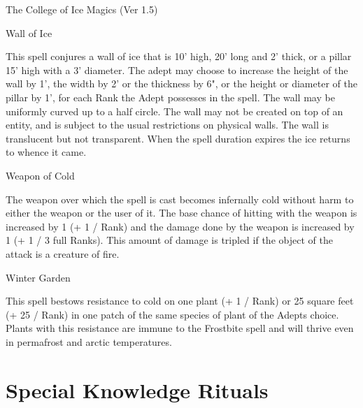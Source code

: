 \begin{Chapter}{The College of Ice Magics (Ver 1.5)}
\begin{spell}[S-15]{Wall of Ice}
\begin{effects}
This spell conjures a wall of ice that is 10’ high, 20’ long and 2’
thick, or a pillar 15’ high with a 3’ diameter.  The adept may choose
to increase the height of the wall by 1’, the width by 2’ or the
thickness by 6", or the height or diameter of the pillar by 1’, for
each Rank the Adept possesses in the spell. The wall may be uniformly
curved up to a half circle. The wall may not be created on top of an
entity, and is subject to the usual restrictions on physical walls.
The wall is translucent but not transparent. When the spell duration
expires the ice returns to whence it came.
\end{effects}
\end{spell}

\begin{spell}[S-16]{Weapon of Cold}
\begin{effects}
The weapon over which the spell is cast becomes infernally cold
without harm to either the weapon or the user of it. The base chance
of hitting with the weapon is increased by 1 (+ 1 / Rank) and the
damage done by the weapon is increased by 1 (+ 1 / 3 full Ranks).
This amount of damage is tripled if the object of the attack is a
creature of fire.
\end{effects}
\end{spell}

\begin{spell}[S-17]{Winter Garden}

\begin{effects}
This spell bestows resistance to cold on one plant (+ 1 / Rank) or 25
square feet (+ 25 / Rank) in one patch of the same species of plant of
the Adepts choice.  Plants with this resistance are immune to the
Frostbite spell and will thrive even in permafrost and arctic
temperatures.
\end{effects}
\end{spell}


\section{Special Knowledge Rituals}


\end{Chapter}
